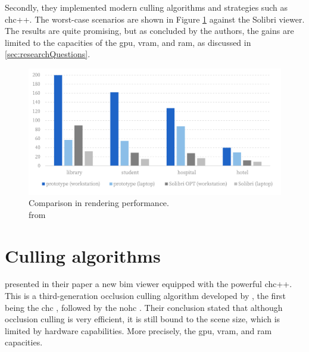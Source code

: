Secondly, they implemented modern culling algorithms and strategies such as \ac{chc}++. The worst-case scenarios are shown in Figure \ref{fig:performanceJohansson} against the Solibri viewer. The results are quite promising, but as concluded by the authors, the gains are limited to the capacities of the \ac{gpu}, \ac{vram}, and \ac{ram}, as discussed in \ref{sec:researchQuestions}.

\begin{figure}[H]
    \centering
    \includegraphics[width=\textwidth]{figures/pdf/JohanssonPerformances.pdf}
    \caption[Performance viewers]{Comparison in rendering performance.\\ from \cite{Johansson2015}}
    \label{fig:performanceJohansson}
\end{figure}

\section{Culling algorithms}\label{sec:historyCulling}
\cite{Johansson2015} presented in their paper a new \ac{bim} viewer equipped with the powerful \ac{chc}++. This is a third-generation occlusion culling algorithm developed by \cite{Mattausch2008}, the first being the \ac{chc} \parencite{Bittner2004}, followed by the \ac{nohc} \parencite{Michael2006}. Their conclusion stated that although occlusion culling is very efficient, it is still bound to the scene size, which is limited by hardware capabilities. More precisely, the \ac{gpu}, \ac{vram}, and \ac{ram} capacities.